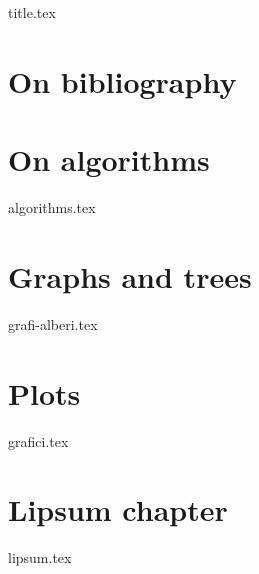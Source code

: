 \documentclass[a4paper,11pt,oneside]{book}
\begin{document}
 
\frontmatter
{title.tex}
 
\clearpage
\thispagestyle{empty}
 
\tableofcontents
 
\mainmatter
\chapter{On bibliography}
 
\chapter{On algorithms}
{algorithms.tex}
 
\chapter{Graphs and trees}
{grafi-alberi.tex}
 
\chapter{Plots}
{grafici.tex}
 
\chapter{Lipsum chapter}
{lipsum.tex}
 
 
 
\end{document}
